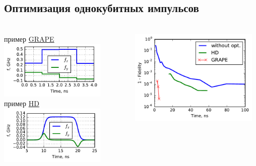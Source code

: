 \documentclass[aspectratio=169, 13pt]{beamer}
\begin{document}
\subsection{Оптимизация однокубитных импульсов}
\begin{frame}[c]\frametitle{\secname}\framesubtitle{\subsecname}
\begin{columns}[c]
\centering
пример \underline{GRAPE}
\includegraphics[width = 0.8\textwidth]{grape_pulse}
\vspace{0.1cm}
\\
пример \underline{HD}
\includegraphics[width = 0.8\textwidth]{hd_pulse}

\includegraphics[width = 0.95\textwidth]{optimization_results}

\end{columns}

\end{frame}
\end{document}
